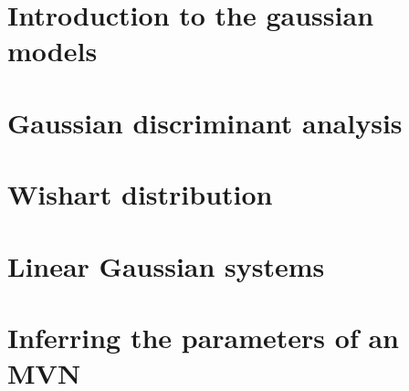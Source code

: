\section{Introduction to the gaussian models}

\section{Gaussian discriminant analysis}

\section{Wishart distribution}

\section{Linear Gaussian systems}

\section{Inferring the parameters of an MVN}

